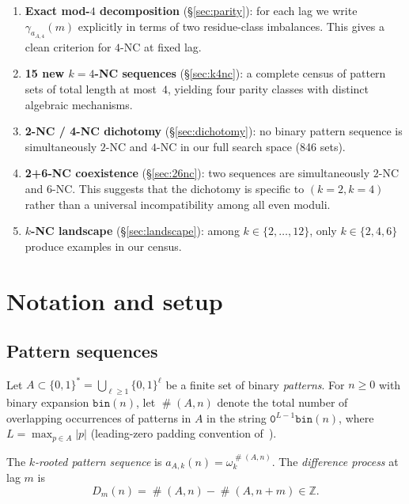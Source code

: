 \documentclass[11pt]{article}
\theoremstyle{definition}
\theoremstyle{remark}
\DeclareMathOperator{\occ}{\#}
\newcommand{\Z}{\mathbb{Z}}
\begin{document}
\begin{enumerate}[label=(\roman*)]
  \item \textbf{Exact mod-$4$ decomposition} (\S\ref{sec:parity}):
        for each lag we write $\gamma_{a_{A,4}}(m)$ explicitly in terms
        of two residue-class imbalances.  This gives a clean criterion
        for $4$-NC at fixed lag.
  \item \textbf{15 new $k=4$-NC sequences} (\S\ref{sec:k4nc}):
        a complete census of pattern sets of total length at most~$4$,
        yielding four parity classes with distinct algebraic mechanisms.
  \item \textbf{2-NC / 4-NC dichotomy} (\S\ref{sec:dichotomy}):
        no binary pattern sequence is simultaneously $2$-NC and $4$-NC
        in our full search space (846 sets).
  \item \textbf{2+6-NC coexistence} (\S\ref{sec:26nc}):
        two sequences are simultaneously $2$-NC and $6$-NC.  This
        suggests that the dichotomy is specific to $(k=2,k=4)$ rather
        than a universal incompatibility among all even moduli.
  \item \textbf{$k$-NC landscape} (\S\ref{sec:landscape}):
        among $k \in \{2,\ldots,12\}$, only $k \in \{2, 4, 6\}$
        produce examples in our census.
\end{enumerate}

\section{Notation and setup}
\label{sec:notation}

\subsection{Pattern sequences}

Let $A \subset \{0,1\}^* = \bigcup_{\ell \geq 1}\{0,1\}^\ell$ be a
finite set of binary \emph{patterns}.  For $n \geq 0$ with binary
expansion $\mathtt{bin}(n)$, let $\occ(A, n)$ denote the total number
of overlapping occurrences of patterns in $A$ in the string
$\mathtt{0}^{L-1}\mathtt{bin}(n)$, where $L = \max_{p \in A}|p|$
(leading-zero padding convention of~\cite{Kon21}).

The \emph{$k$-rooted pattern sequence} is $a_{A,k}(n) = \omega_k^{\occ(A,n)}$.
The \emph{difference process} at lag $m$ is
\[
  D_m(n) = \occ(A,n) - \occ(A,n+m) \in \Z.
\]
\end{document}
